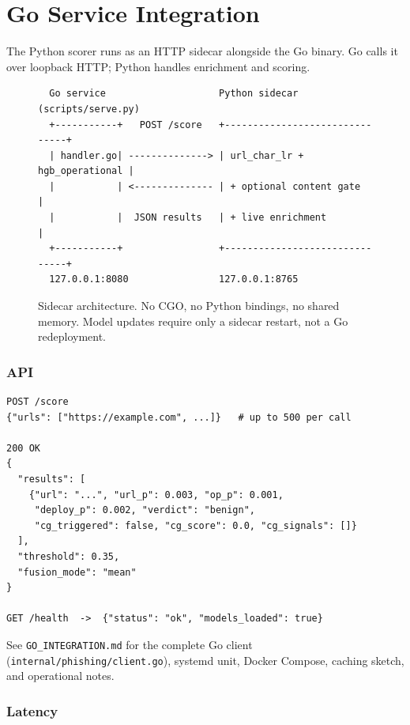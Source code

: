 \documentclass[11pt,a4paper]{article}
\newcommand{\code}[1]{\texttt{#1}}
\begin{document}
\section{Go Service Integration}

The Python scorer runs as an HTTP sidecar alongside the Go binary.
Go calls it over loopback HTTP; Python handles enrichment and scoring.

\begin{figure}[h]
\begin{lstlisting}
  Go service                    Python sidecar (scripts/serve.py)
  +-----------+   POST /score   +-------------------------------+
  | handler.go| --------------> | url_char_lr + hgb_operational |
  |           | <-------------- | + optional content gate       |
  |           |  JSON results   | + live enrichment             |
  +-----------+                 +-------------------------------+
  127.0.0.1:8080                127.0.0.1:8765
\end{lstlisting}
\caption{Sidecar architecture. No CGO, no Python bindings, no shared
  memory. Model updates require only a sidecar restart, not a Go
  redeployment.}
\end{figure}

\subsubsection*{API}

\begin{lstlisting}[language={}]
POST /score
{"urls": ["https://example.com", ...]}   # up to 500 per call

200 OK
{
  "results": [
    {"url": "...", "url_p": 0.003, "op_p": 0.001,
     "deploy_p": 0.002, "verdict": "benign",
     "cg_triggered": false, "cg_score": 0.0, "cg_signals": []}
  ],
  "threshold": 0.35,
  "fusion_mode": "mean"
}

GET /health  ->  {"status": "ok", "models_loaded": true}
\end{lstlisting}

See \code{GO\_INTEGRATION.md} for the complete Go client
(\code{internal/phishing/client.go}), systemd unit, Docker Compose,
caching sketch, and operational notes.

\subsubsection*{Latency}
\end{document}
